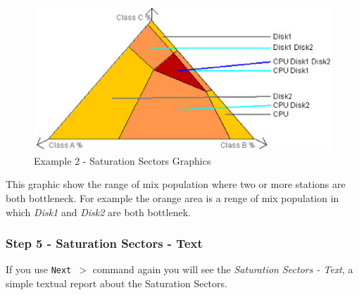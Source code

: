 \begin{figure}[htbp]
    \begin{center}
        \includegraphics[scale=.75]{img/jaba/example2SatSector}
    \end{center}
    \caption{Example 2 - Saturation Sectors Graphics}
    \label{fig:jaba:example2SatSector}
\end{figure}

This graphic show the range of mix population where two or more stations are both bottleneck.
For example the orange area is a renge of mix population in which \textit{Disk1} and \textit{Disk2} are both bottlenek.

\subsubsection{Step 5 - Saturation Sectors - Text}

If you use \texttt{Next $>$} command again you will see the \textit{Saturation Sectors - Text}, a simple textual report about the Saturation Sectors. 
